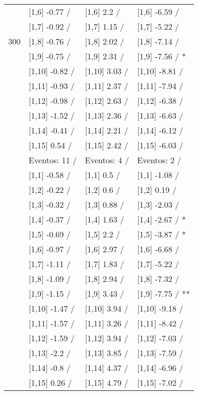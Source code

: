 \begin{table}
\begin{tabular}[t]{llll}
 & {}[1,6] -0.77  / & {}[1,6] 2.2  / & {}[1,6] -6.59  /\\
 & {}[1,7] -0.92  / & {}[1,7] 1.15  / & {}[1,7] -5.22  /\\
300 & {}[1,8] -0.76  / & {}[1,8] 2.02  / & {}[1,8] -7.14  /\\
\addlinespace
 & {}[1,9] -0.75  / & {}[1,9] 2.31  / & {}[1,9] -7.56  / *\\
 & {}[1,10] -0.82  / & {}[1,10] 3.03  / & {}[1,10] -8.81  /\\
 & {}[1,11] -0.93  / & {}[1,11] 2.37  / & {}[1,11] -7.94  /\\
 & {}[1,12] -0.98  / & {}[1,12] 2.63  / & {}[1,12] -6.38  /\\
 & {}[1,13] -1.52  / & {}[1,13] 2.36  / & {}[1,13] -6.63  /\\
\addlinespace
 & {}[1,14] -0.41  / & {}[1,14] 2.21  / & {}[1,14] -6.12  /\\
 & {}[1,15] 0.54  / & {}[1,15] 2.42  / & {}[1,15] -6.03  /\\
 & Eventos:  11 / & Eventos:  4 / & Eventos:  2 /\\
 & {}[1,1] -0.58  / & {}[1,1] 0.5  / & {}[1,1] -1.08  /\\
 & {}[1,2] -0.22  / & {}[1,2] 0.6  / & {}[1,2] 0.19  /\\
\addlinespace
 & {}[1,3] -0.32  / & {}[1,3] 0.88  / & {}[1,3] -2.03  /\\
 & {}[1,4] -0.37  / & {}[1,4] 1.63  / & {}[1,4] -2.67  / *\\
 & {}[1,5] -0.69  / & {}[1,5] 2.2  / & {}[1,5] -3.87  / *\\
 & {}[1,6] -0.97  / & {}[1,6] 2.97  / & {}[1,6] -6.68  /\\
 & {}[1,7] -1.11  / & {}[1,7] 1.83  / & {}[1,7] -5.22  /\\
\addlinespace
500 & {}[1,8] -1.09  / & {}[1,8] 2.94  / & {}[1,8] -7.32  /\\
 & {}[1,9] -1.15  / & {}[1,9] 3.43  / & {}[1,9] -7.75  / **\\
 & {}[1,10] -1.47  / & {}[1,10] 3.94  / & {}[1,10] -9.18  /\\
 & {}[1,11] -1.57  / & {}[1,11] 3.26  / & {}[1,11] -8.42  /\\
 & {}[1,12] -1.59  / & {}[1,12] 3.94  / & {}[1,12] -7.03  /\\
\addlinespace
 & {}[1,13] -2.2  / & {}[1,13] 3.85  / & {}[1,13] -7.59  /\\
 & {}[1,14] -0.8  / & {}[1,14] 4.37  / & {}[1,14] -6.96  /\\
 & {}[1,15] 0.26  / & {}[1,15] 4.79  / & {}[1,15] -7.02  /\\
\bottomrule
\end{tabular}
\end{table}
